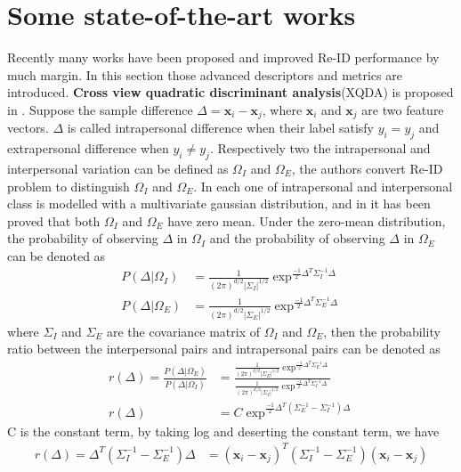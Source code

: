 \section{Some state-of-the-art works}
Recently many works have been proposed and improved Re-ID performance by much margin. In this section those advanced descriptors and metrics are introduced. 
\textbf{Cross view quadratic discriminant analysis}(XQDA) is proposed in \cite{LOMO}. Suppose the sample difference $\Delta = \bm{x}_i - \bm{x}_j$, where $\bm{x}_i $ and $\bm{x}_j$ are two feature vectors. $\Delta$ is called intrapersonal difference when their label satisfy $y_i = y_j$ and extrapersonal difference when $y_i \ne y_j$. Respectively two the intrapersonal and interpersonal variation can be defined as $\Omega_I$ and $\Omega_E$, the authors convert Re-ID problem to distinguish $\Omega_I$ and $\Omega_E$. In \cite{Bayeface}  each one of intrapersonal and interpersonal class is modelled with a multivariate gaussian distribution, and in \cite{Bayeface} it has been proved that both $\Omega_I$ and $\Omega_E$ have zero mean. Under the zero-mean distribution, the probability of observing $\Delta$ in $\Omega_I$ and the probability of observing $\Delta$ in $\Omega_E$ can be denoted as
\begin{equation}
\begin{aligned}
P(\Delta|\Omega_I) &= \frac{1}{(2\pi)^{d/2}|\Sigma_I|^{1/2}}\exp^{\frac{-1}{2}\Delta^T\Sigma_I^{-1}\Delta}\\
P(\Delta|\Omega_E) &= \frac{1}{(2\pi)^{d/2}|\Sigma_E|^{1/2}}\exp^{\frac{-1}{2}\Delta^T\Sigma_E^{-1}\Delta}
\end{aligned}
\end{equation}
where $\Sigma_I$ and $\Sigma_E$ are the covariance matrix of $\Omega_I$ and $\Omega_E$, then the probability ratio between the interpersonal pairs and intrapersonal pairs can be denoted as
\begin{equation}
\begin{aligned}
r(\Delta) = \frac{P(\Delta|\Omega_E)}{P(\Delta|\Omega_I)}
	   &=\frac{\frac{1}{(2\pi)^{d/2}|\Sigma_E|^{1/2}}\exp^{\frac{-1}{2}\Delta^T\Sigma_E^{-1}\Delta}}{\frac{1}{(2\pi)^{d/2}|\Sigma_I|^{1/2}}\exp^{\frac{-1}{2}\Delta^T\Sigma_I^{-1}\Delta}}\\
r(\Delta)& =  C\exp^{\frac{-1}{2}\Delta^T(\Sigma_E^{-1} - \Sigma_I^{-1})\Delta}
\end{aligned}
\end{equation}
C is the constant term, by taking log and deserting the constant term, we have 
\begin{equation}
\begin{aligned}
r(\Delta) = \Delta^T(\Sigma_I^{-1} - \Sigma_E^{-1})\Delta 
	   & = (\bm{x}_i - \bm{x}_j)^T(\Sigma_I^{-1} - \Sigma_E^{-1})(\bm{x}_i - \bm{x}_j)
\end{aligned}
\end{equation}
